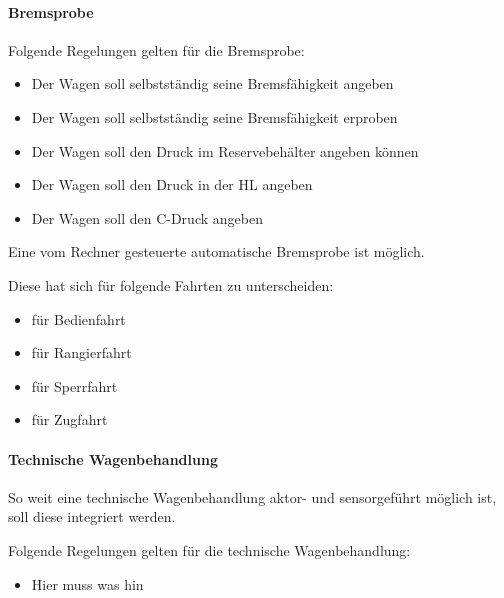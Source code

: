 \paragraph{Bremsprobe}
\begin{feat}
Folgende Regelungen gelten für die Bremsprobe:
\begin{itemize}
    \item Der Wagen soll selbstständig seine Bremsfähigkeit angeben
    \item Der Wagen soll selbstständig seine Bremsfähigkeit erproben
    \item Der Wagen soll den Druck im Reservebehälter angeben können
    \item Der Wagen soll den Druck in der \acrshort{HL} angeben
    \item Der Wagen soll den C-Druck angeben
\end{itemize}
\end{feat}
\begin{feat}
Eine vom Rechner gesteuerte automatische Bremsprobe ist möglich.
\end{feat}
\begin{rem} [zu Anf. 46] 
Diese hat sich für folgende Fahrten zu unterscheiden:
\begin{itemize}
    \item für Bedienfahrt
    \item für Rangierfahrt
    \item für Sperrfahrt
    \item für Zugfahrt
\end{itemize}
\end{rem}

\paragraph{Technische Wagenbehandlung}
\begin{feat}
So weit eine technische Wagenbehandlung aktor- und sensorgeführt möglich ist, soll diese integriert werden.
\end{feat}
\begin{feat}
Folgende Regelungen gelten für die technische Wagenbehandlung:
\begin{itemize}
    \item Hier muss was hin
\end{itemize}
\end{feat}

